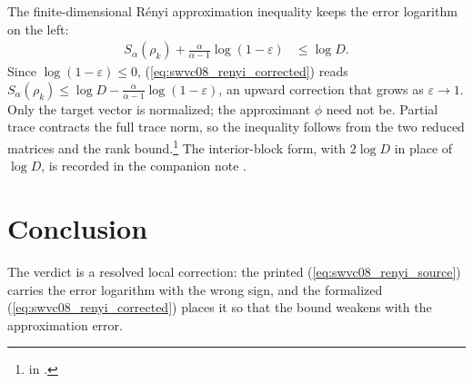 \documentclass{article}
\begin{document}
The finite-dimensional R\'enyi approximation inequality keeps the error
logarithm on the left:
\begin{align}
    S_\alpha(\rho_k)+\frac{\alpha}{\alpha-1}\log(1-\varepsilon)
      &\le\log D.
    \label{eq:swvc08_renyi_corrected}
\end{align}
Since $\log(1-\varepsilon)\le0$, (\ref{eq:swvc08_renyi_corrected}) reads
$S_\alpha(\rho_k)\le\log D-\frac{\alpha}{\alpha-1}\log(1-\varepsilon)$, an
upward correction that grows as $\varepsilon\to1$. Only the target vector is
normalized; the approximant $\phi$ need not be. Partial trace contracts the
full trace norm, so the inequality follows from the two reduced matrices and
the rank bound.\footnote{
    in .}
The interior-block form, with $2\log D$ in place of $\log D$, is recorded in
the companion note .

\section{Conclusion}

The verdict is a resolved local correction: the printed
(\ref{eq:swvc08_renyi_source}) carries the error logarithm with the wrong
sign, and the formalized (\ref{eq:swvc08_renyi_corrected}) places it so that
the bound weakens with the approximation error.



\end{document}
